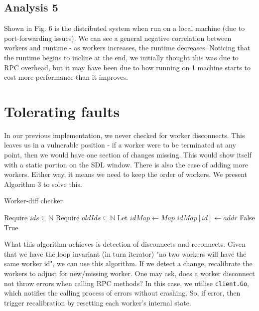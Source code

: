\documentclass[twoside,twocolumn]{article}
\begin{document}
\subsection{Analysis 5}
Shown in Fig. 6 is the distributed system when run on a local machine (due to port-forwarding issues).
We can see a general negative correlation between workers and runtime - as workers increases, the runtime decreases.
Noticing that the runtime begins to incline at the end, we initially thought this was due to RPC overhead, but it may have been
due to how running on 1 machine starts to cost more performance than it improves.

\section{Tolerating faults}
In our previous implementation, we never checked for worker disconnects. This leaves us in a vulnerable
position - if a worker were to be terminated at any point, then we would have one section of changes missing.
This would show itself with a static portion on the SDL window. There is also the case of adding more workers. Either
way, it means we need to keep the order of workers. We present Algorithm 3 to solve this.
\begin{algorithm}
  \caption{Worker-diff checker}
  \begin{algorithmic}
    \State Require $ids \subseteq \mathbb{N}$
    \State Require $oldIds \subseteq \mathbb{N}$ 
    \State Let $idMap \gets Map$
      \State $idMap[id] \gets addr$
    \EndFor
      \State \Return False
      \EndIf
    \EndFor
    \State \Return True
  \end{algorithmic}
\end{algorithm}


What this algorithm achieves is detection of disconnects and reconnects.
Given that we have the loop invariant (in turn iterator) "no two workers will have the same worker id",
we can use this algorithm. If we detect a change, recalibrate the workers to adjust for new/missing worker. 
One may ask, does a worker disconnect not throw errors when calling RPC methods? In this case, we utilise \texttt{client.Go},
which notifies the calling process of errors without crashing. So, if error, then trigger recalibration by resetting each worker's
internal state.
\end{document}
